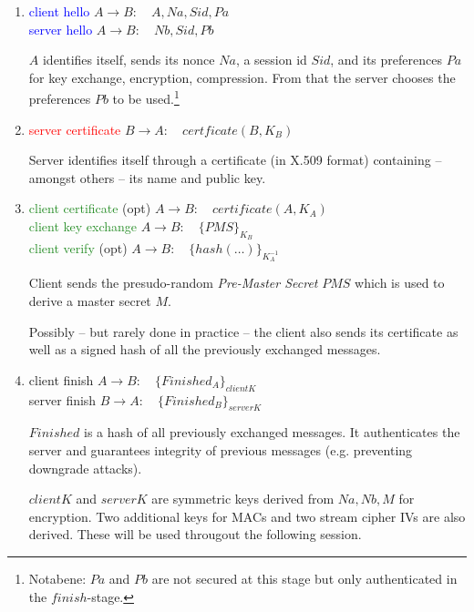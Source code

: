 \begin{enumerate}
    \item
    \textcolor{blue}{client hello} \quad $A \rightarrow B: \quad A, Na, Sid, Pa $ \\
    \textcolor{blue}{server hello} \quad $A \rightarrow B: \quad Nb, Sid, Pb $
    
    $A$ identifies itself, sends its nonce $Na$, a session id $Sid$, and its preferences $Pa$ for key exchange, encryption, compression. From that the server chooses the preferences $Pb$ to be used.\footnote{Notabene: $Pa$ and $Pb$ are not secured at this stage but only authenticated in the $finish$-stage.}
    
    \item
    \textcolor{red}{server certificate} \quad $B \rightarrow A: \quad certficate(B, K_B) $
    
    Server identifies itself through a certificate (in X.509 format) containing -- amongst others -- its name and public key.
    
    \item
    \textcolor{ForestGreen}{client certificate} (opt) \quad $A \rightarrow B: \quad certificate(A, K_A) $ \\
    \textcolor{ForestGreen}{client key exchange} \quad $A \rightarrow B: \quad \{ PMS \} _{K_B}$ \\
    \textcolor{ForestGreen}{client verify} (opt) \quad \quad $A \rightarrow B: \quad \{ hash(\dots) \} _{K_A^{-1}}$
    
    Client sends the presudo-random \textit{Pre-Master Secret} $PMS$ which is used to derive a master secret $M$.
    
    Possibly --  but rarely done in practice -- the client also sends its certificate as well as a signed hash of all the previously exchanged messages.
    
    \item
    \textcolor{BurntOrange}{client finish} \quad $A \rightarrow B: \quad \{ Finished_A \} _{clientK} $ \\
    \textcolor{BurntOrange}{server finish} \quad $B \rightarrow A: \quad \{ Finished_B \} _{serverK} $ 
    
    $Finished$ is a hash of all previously exchanged messages. It authenticates the server and guarantees integrity of previous messages (e.g. preventing downgrade attacks).
    
    $clientK$ and $serverK$ are symmetric keys derived from $Na, Nb, M$ for encryption. Two additional keys for MACs and two stream cipher IVs are also derived. These will be used througout the following session.
\end{enumerate}

